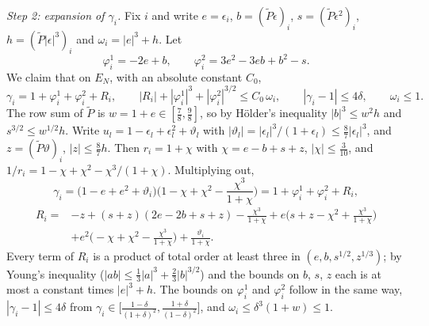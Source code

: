 \documentclass[11pt,a4paper]{article}
\makeatletter
\theoremstyle{stmt}
\theoremstyle{defn}
\theoremstyle{rmk}
\renewenvironment{proof}[1][\proofname]{\par\pushQED{\qed}\normalfont\topsep6\p@\@plus6\p@\relax
  \trivlist\item[\hskip\labelsep{\sffamily\itshape\small #1.}]\ignorespaces}{\popQED\endtrivlist\@endpefalse}
\numberwithin{equation}{section}
\makeatother
\begin{document}
{\begin{proof}
\emph{Step 2: expansion of $\gamma_i$.} Fix $i$ and write $e=\epsilon_i$, $b=(\tilde P\epsilon)_i$, $s=(\tilde P\epsilon^2)_i$, $h=(\tilde P|\epsilon|^3)_i$ and $\omega_i=|e|^3+h$. Let
\[
\varphi^1_i=-2e+b,\qquad\varphi^2_i=3e^2-3eb+b^2-s .
\]
We claim that on $E_N$, with an absolute constant $C_0$,
\begin{equation}\label{eq:bias-gamma}
\gamma_i=1+\varphi^1_i+\varphi^2_i+R_i,\qquad|R_i|+|\varphi^1_i|^3+|\varphi^2_i|^{3/2}\le C_0\,\omega_i,\qquad|\gamma_i-1|\le4\delta,\qquad\omega_i\le1 .
\end{equation}
The row sum of $\tilde P$ is $w=1+e\in[\frac78,\frac98]$, so by H\"older's inequality $|b|^3\le w^2h$ and $s^{3/2}\le w^{1/2}h$. Write $u_l=1-\epsilon_l+\epsilon_l^2+\vartheta_l$ with $|\vartheta_l|=|\epsilon_l|^3/(1+\epsilon_l)\le\frac87|\epsilon_l|^3$, and $z=(\tilde P\vartheta)_i$, $|z|\le\frac87h$. Then $r_i=1+\chi$ with $\chi=e-b+s+z$, $|\chi|\le\frac{3}{10}$, and $1/r_i=1-\chi+\chi^2-\chi^3/(1+\chi)$. Multiplying out,
\[
\gamma_i=\big(1-e+e^2+\vartheta_i\big)\Big(1-\chi+\chi^2-\frac{\chi^3}{1+\chi}\Big)=1+\varphi^1_i+\varphi^2_i+R_i,
\]
\[
\begin{aligned}
R_i={}&-z+(s+z)(2e-2b+s+z)-\frac{\chi^3}{1+\chi}+e\Big(s+z-\chi^2+\frac{\chi^3}{1+\chi}\Big)\\
&+e^2\Big(-\chi+\chi^2-\frac{\chi^3}{1+\chi}\Big)+\frac{\vartheta_i}{1+\chi}.
\end{aligned}
\]
Every term of $R_i$ is a product of total order at least three in $(e,b,s^{1/2},z^{1/3})$; by Young's inequality ($|ab|\le\frac13|a|^3+\frac23|b|^{3/2}$) and the bounds on $b$, $s$, $z$ each is at most a constant times $|e|^3+h$. The bounds on $\varphi^1_i$ and $\varphi^2_i$ follow in the same way, $|\gamma_i-1|\le4\delta$ from $\gamma_i\in\big[\frac{1-\delta}{(1+\delta)^2},\frac{1+\delta}{(1-\delta)^2}\big]$, and $\omega_i\le\delta^3(1+w)\le1$.


\end{proof}}
\end{document}
